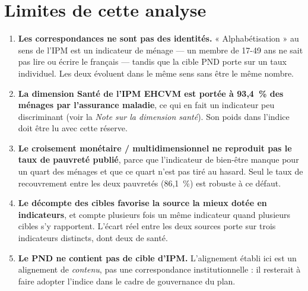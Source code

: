\documentclass[11pt,a4paper]{article}
\begin{document}
\section{Limites de cette analyse}

\begin{enumerate}
  \item \textbf{Les correspondances ne sont pas des identités.} « Alphabétisation » au sens de
        l'IPM est un indicateur de ménage --- un membre de 17-49 ans ne sait pas lire ou écrire le
        français --- tandis que la cible PND porte sur un taux individuel. Les deux évoluent dans
        le même sens sans être le même nombre.
  \item \textbf{La dimension Santé de l'IPM EHCVM est portée à 93,4~\% des ménages par l'assurance
        maladie}, ce qui en fait un indicateur peu discriminant (voir la \emph{Note sur la
        dimension santé}). Son poids dans l'indice doit être lu avec cette réserve.
  \item \textbf{Le croisement monétaire / multidimensionnel ne reproduit pas le taux de pauvreté
        publié}, parce que l'indicateur de bien-être manque pour un quart des ménages et que ce
        quart n'est pas tiré au hasard. Seul le taux de recouvrement entre les deux pauvretés
        (86,1~\%) est robuste à ce défaut.
  \item \textbf{Le décompte des cibles favorise la source la mieux dotée en indicateurs}, et
        compte plusieurs fois un même indicateur quand plusieurs cibles s'y rapportent. L'écart réel
        entre les deux sources porte sur trois indicateurs distincts, dont deux de santé.
  \item \textbf{Le PND ne contient pas de cible d'IPM.} L'alignement établi ici est un alignement
        de \emph{contenu}, pas une correspondance institutionnelle : il resterait à faire adopter
        l'indice dans le cadre de gouvernance du plan.
\end{enumerate}
\end{document}
